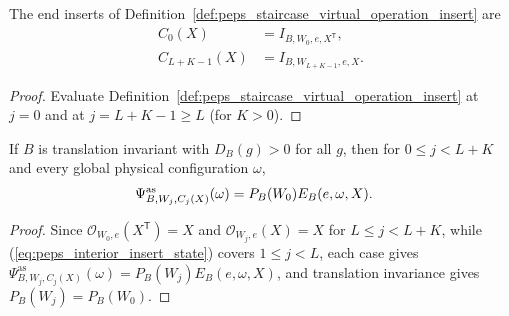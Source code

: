 \begin{lemma}%
    \label{lem:peps_staircase_virtual_operation_end_inserts}
    \leanok
    The end inserts of Definition~\ref{def:peps_staircase_virtual_operation_insert}
    are
    \begin{align}
        C_0(X)       & =I_{B,W_0,e,X^{\mathsf T}},
        \label{eq:peps_staircase_first}            \\
        C_{L+K-1}(X) & =I_{B,W_{L+K-1},e,X}.
        \label{eq:peps_staircase_last}
    \end{align}
\end{lemma}
\begin{proof}
    \leanok
    Evaluate Definition~\ref{def:peps_staircase_virtual_operation_insert} at
    $j=0$ and at $j=L+K-1\ge L$ (for $K>0$).
\end{proof}

\begin{lemma}%
    \label{thm:peps_staircase_virtual_operation_common_state}
    \leanok
    If $B$ is translation invariant with $D_B(g)>0$ for all $g$, then for
    $0\le j<L+K$ and every global physical configuration $\omega$,
    \begin{align}
        \Psi^{\mathrm{as}}_{B,W_j,C_j(X)}(\omega)
         & =P_B(W_0)E_B(e,\omega,X).
        \notag
    \end{align}
\end{lemma}
\begin{proof}
    \leanok
    Since $\mathcal O_{W_0,e}(X^{\mathsf T})=X$ and
    $\mathcal O_{W_j,e}(X)=X$ for $L\le j<L+K$, while
    (\ref{eq:peps_interior_insert_state}) covers $1\le j<L$, each case gives
    $\Psi^{\mathrm{as}}_{B,W_j,C_j(X)}(\omega)=P_B(W_j)E_B(e,\omega,X)$, and
    translation invariance gives $P_B(W_j)=P_B(W_0)$.
\end{proof}

